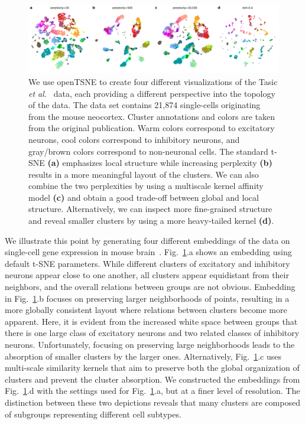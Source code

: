 \documentclass[twocolumn]{bmcart}
\begin{document}
\begin{figure}[htbp]
	\includegraphics[width=\textwidth]{tasic2018}
	\caption{\label{fig:tasic}We use openTSNE to create four different
    visualizations of the Tasic \textit{et al.}~\cite{tasic2018shared} data,
    each providing a different perspective into the topology of the data.
    The data set contains 21,874 single-cells originating from the mouse
	neocortex. Cluster annotations and colors are taken from the original
	publication. Warm colors correspond to excitatory neurons, cool colors
	correspond to inhibitory neurons, and gray/brown colors correspond to
	non-neuronal cells. The standard t-SNE \textbf{(a)} emphasizes local
	structure while increasing perplexity \textbf{(b)} results in a more
	meaningful layout of the clusters. We can also combine the two
	perplexities by using a multiscale kernel affinity model \textbf{(c)}
	and obtain a good trade-off between global and local structure.
	Alternatively, we can inspect more fine-grained structure and reveal
	smaller clusters by using a more heavy-tailed kernel \textbf{(d)}.}
\end{figure}

We illustrate this point by generating four different embeddings of the data on single-cell gene expression in mouse brain~\cite{tasic2018shared}.  Fig.~\ref{fig:tasic}.a shows an embedding using default t-SNE parameters. While different clusters of excitatory and inhibitory neurons appear close to one another, all clusters appear equidistant from their neighbors, and the overall relations between groups are not obvious. Embedding in Fig.~\ref{fig:tasic}.b focuses on preserving larger neighborhoods of points, resulting in a more globally consistent layout where relations between clusters become more apparent. Here, it is evident from the increased white space between groups that there is one large class of excitatory neurons and two related classes of inhibitory neurons. Unfortunately, focusing on preserving large neighborhoods leads to the absorption of smaller clusters by the larger ones. Alternatively, Fig.~\ref{fig:tasic}.c uses multi-scale similarity kernels that aim to preserve both the global organization of clusters and prevent the cluster absorption. We constructed the embeddings from Fig.~\ref{fig:tasic}.d with the settings used for Fig.~\ref{fig:tasic}.a, but at a finer level of resolution. The distinction between these two depictions reveals that many clusters are composed of subgroups representing different cell subtypes.
\end{document}
